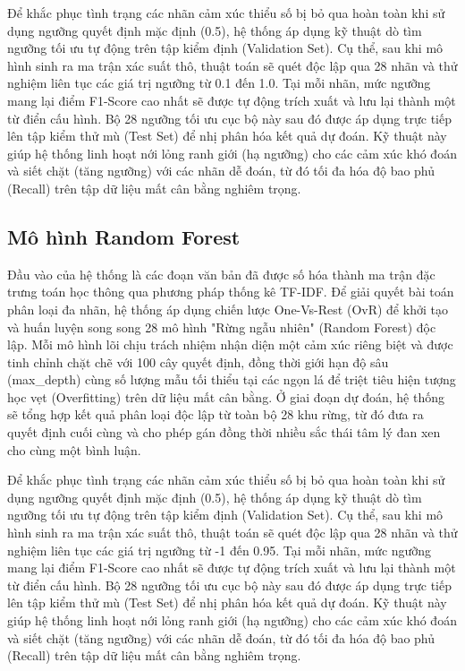 Để khắc phục tình trạng các nhãn cảm xúc thiểu số bị bỏ qua hoàn toàn khi sử dụng ngưỡng quyết định mặc định (0.5), hệ thống áp dụng kỹ thuật dò tìm ngưỡng tối ưu tự động trên tập kiểm định (Validation Set). Cụ thể, sau khi mô hình sinh ra ma trận xác suất thô, thuật toán sẽ quét độc lập qua 28 nhãn và thử nghiệm liên tục các giá trị ngưỡng từ 0.1 đến 1.0. Tại mỗi nhãn, mức ngưỡng mang lại điểm F1-Score cao nhất sẽ được tự động trích xuất và lưu lại thành một từ điển cấu hình. Bộ 28 ngưỡng tối ưu cục bộ này sau đó được áp dụng trực tiếp lên tập kiểm thử mù (Test Set) để nhị phân hóa kết quả dự đoán. Kỹ thuật này giúp hệ thống linh hoạt nới lỏng ranh giới (hạ ngưỡng) cho các cảm xúc khó đoán và siết chặt (tăng ngưỡng) với các nhãn dễ đoán, từ đó tối đa hóa độ bao phủ (Recall) trên tập dữ liệu mất cân bằng nghiêm trọng.

\subsection{Mô hình Random Forest}

Đầu vào của hệ thống là các đoạn văn bản đã được số hóa thành ma trận đặc trưng toán học thông qua phương pháp thống kê TF-IDF. Để giải quyết bài toán phân loại đa nhãn, hệ thống áp dụng chiến lược One-Vs-Rest (OvR) để khởi tạo và huấn luyện song song 28 mô hình "Rừng ngẫu nhiên" (Random Forest) độc lập. Mỗi mô hình lõi chịu trách nhiệm nhận diện một cảm xúc riêng biệt và được tinh chỉnh chặt chẽ với 100 cây quyết định, đồng thời giới hạn độ sâu (max\_depth) cùng số lượng mẫu tối thiểu tại các ngọn lá để triệt tiêu hiện tượng học vẹt (Overfitting) trên dữ liệu mất cân bằng. Ở giai đoạn dự đoán, hệ thống sẽ tổng hợp kết quả phân loại độc lập từ toàn bộ 28 khu rừng, từ đó đưa ra quyết định cuối cùng và cho phép gán đồng thời nhiều sắc thái tâm lý đan xen cho cùng một bình luận. 

Để khắc phục tình trạng các nhãn cảm xúc thiểu số bị bỏ qua hoàn toàn khi sử dụng ngưỡng quyết định mặc định (0.5), hệ thống áp dụng kỹ thuật dò tìm ngưỡng tối ưu tự động trên tập kiểm định (Validation Set). Cụ thể, sau khi mô hình sinh ra ma trận xác suất thô, thuật toán sẽ quét độc lập qua 28 nhãn và thử nghiệm liên tục các giá trị ngưỡng từ -1 đến 0.95. Tại mỗi nhãn, mức ngưỡng mang lại điểm F1-Score cao nhất sẽ được tự động trích xuất và lưu lại thành một từ điển cấu hình. Bộ 28 ngưỡng tối ưu cục bộ này sau đó được áp dụng trực tiếp lên tập kiểm thử mù (Test Set) để nhị phân hóa kết quả dự đoán. Kỹ thuật này giúp hệ thống linh hoạt nới lỏng ranh giới (hạ ngưỡng) cho các cảm xúc khó đoán và siết chặt (tăng ngưỡng) với các nhãn dễ đoán, từ đó tối đa hóa độ bao phủ (Recall) trên tập dữ liệu mất cân bằng nghiêm trọng.

